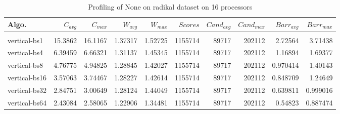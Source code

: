 \begin{table*}[htbp]
\centering
 \begin{tabular}{l r r r r r r r r r}
Algo. & $C_{avg}$ & $C_{max}$ & $W_{avg}$ & $W_{max}$ & $Scores$ & $Cand_{avg}$ & $Cand_{max}$ & $Barr_{avg}$ & $Barr_{max}$ \\
\hline \\
vertical-bs1 & 15.3862 & 16.1167 & 1.37317 & 1.52725 & 1155714 & 89717 & 202112 & 2.72564 & 3.71438 \\
vertical-bs4 & 6.39459 & 6.66321 & 1.31137 & 1.45345 & 1155714 & 89717 & 202112 & 1.16894 & 1.69377 \\
vertical-bs8 & 4.76775 & 4.94825 & 1.28845 & 1.42027 & 1155714 & 89717 & 202112 & 0.970414 & 1.40143 \\
vertical-bs16 & 3.57063 & 3.74467 & 1.28227 & 1.42614 & 1155714 & 89717 & 202112 & 0.848709 & 1.24649 \\
vertical-bs32 & 2.84751 & 3.00649 & 1.28124 & 1.44049 & 1155714 & 89717 & 202112 & 0.639811 & 0.999016 \\
vertical-bs64 & 2.43084 & 2.58065 & 1.22906 & 1.34481 & 1155714 & 89717 & 202112 & 0.54823 & 0.887474 \\
 
\end{tabular}
\caption{Profiling of None on radikal dataset on 16 processors }
\label{tab:radikal:16}
\end{table*}
